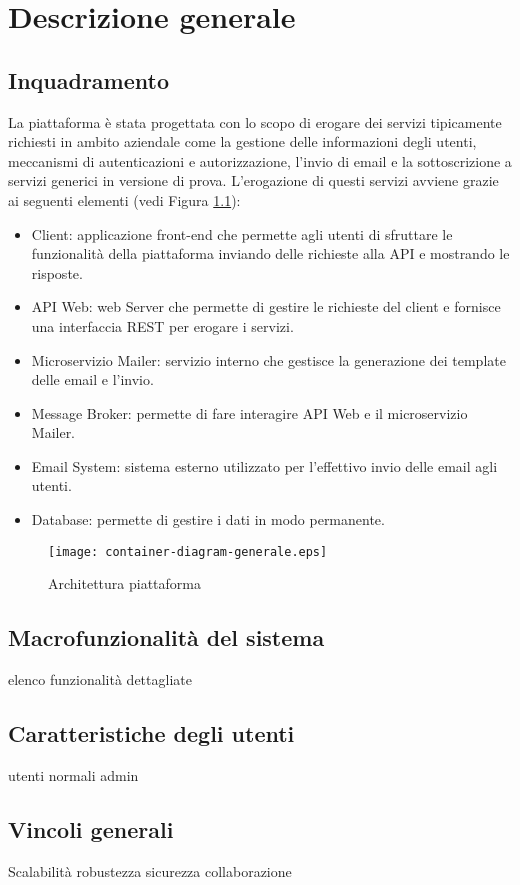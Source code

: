 \chapter{Descrizione generale}

\section{Inquadramento}
La piattaforma è stata progettata con lo scopo di erogare dei servizi tipicamente richiesti in ambito aziendale come la gestione delle
informazioni degli utenti, meccanismi di autenticazioni e autorizzazione, l'invio di
email e la sottoscrizione a servizi generici in versione di prova.
L'erogazione di questi servizi avviene grazie ai seguenti elementi (vedi Figura \ref{fig:Piattaforma}):
\begin{itemize}
    \itemsep0em
    \item Client: applicazione front-end che permette agli utenti di sfruttare le funzionalità della piattaforma inviando delle richieste alla API e mostrando le risposte.
    \item API Web: web Server che permette di gestire le richieste del client e fornisce una interfaccia REST per erogare i servizi.
    \item Microservizio Mailer: servizio interno che gestisce la generazione dei template delle email e l'invio.
    \item Message Broker: permette di fare interagire API Web e il microservizio Mailer.
    \item Email System: sistema esterno utilizzato per l'effettivo invio delle email agli utenti.
    \item Database: permette di gestire i dati in modo permanente.
\end{itemize}

\begin{figure}[H]
    \centering
    \texttt{[image: container-diagram-generale.eps]}
    \caption{Architettura piattaforma}
    \label{fig:Piattaforma}
\end{figure}
\newpage

\section{Macrofunzionalità del sistema}
elenco funzionalità dettagliate

\section{Caratteristiche degli utenti}
utenti normali
admin

\section{Vincoli generali}
Scalabilità
robustezza
sicurezza
collaborazione

